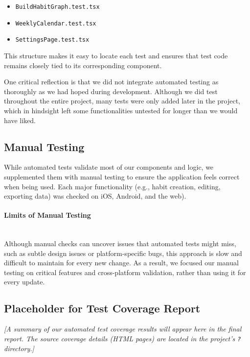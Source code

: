 \begin{itemize} \item \texttt{BuildHabitGraph.test.tsx}\item \texttt{WeeklyCalendar.test.tsx} \item \texttt{SettingsPage.test.tsx} \end{itemize}

This structure makes it easy to locate each test and ensures that test code remains closely tied to its corresponding component.

One critical reflection is that we did not integrate automated testing as thoroughly as we had hoped during development. Although we did test throughout the entire project, many tests were only added later in the project, which in hindsight left some functionalities untested for longer than we would have liked.

\subsection{Manual Testing}

While automated tests validate most of our components and logic, we supplemented them with manual testing to ensure the application feels correct when being used. Each major functionality (e.g., habit creation, editing, exporting data) was checked on iOS, Android, and the web).

\paragraph{Limits of Manual Testing}\mbox{}\\
Although manual checks can uncover issues that automated tests might miss, such as subtle design issues or platform-specific bugs, this approach is slow and difficult to maintain for every new change. As a result, we focused our manual testing on critical features and cross-platform validation, rather than using it for every update.

\subsection{Placeholder for Test Coverage Report} \label{sect:test-coverage} \vspace{12pt} \noindent \textit{[A summary of our automated test coverage results will appear here in the final report. The source coverage details (HTML pages) are located in the project’s \texttt{?} directory.]}



